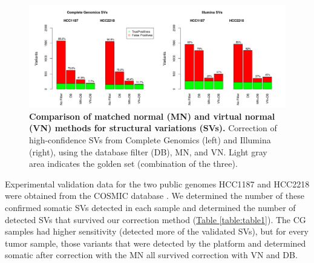 \begin{figure}[t!]
\centering
\includegraphics[width=\textwidth]{chapters/images/virtualnormal/Hiltemann_Figure1.png}
\caption{\textbf{Comparison of matched normal (MN) and virtual normal (VN) methods for structural variations (SVs).} Correction of high-confidence SVs from Complete Genomics (left) and Illumina (right), using the database filter (DB), MN, and VN. Light gray area indicates the golden set (combination of the three).}
\label{fig:svcomparison}
\end{figure}

Experimental validation data for the two public genomes HCC1187 and HCC2218 were obtained from the COSMIC database \cite{forbes2010cosmic,bindal2011cosmic}. We determined the number of these confirmed somatic SVs detected in each sample and determined the number of detected SVs that survived our correction method (\hyperref[table:table1]{Table \ref{table:table1}}). The CG samples had higher sensitivity (detected more of the validated SVs), but for every tumor sample, those variants that were detected by the platform and determined somatic after correction with the MN all survived correction with VN and DB.

